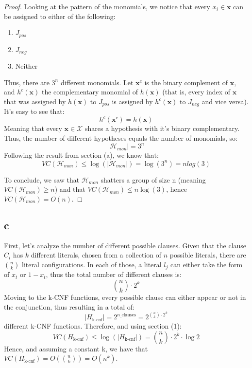 \begin{proof}
    Looking at the pattern of the monomials, we notice that every $x_i \in \boldsymbol{x}$ can be assigned to either of the following:
    \begin{enumerate}
        \item $J_{pos}$
        \item $J_{neg}$
        \item Neither
    \end{enumerate}
    Thus, there are $3^n$ different monomials. 
    Let $\boldsymbol{x}^c$ is the binary complement of $\boldsymbol{x}$, and $h^c(\boldsymbol{x})$ the complementary monomial of $h(\boldsymbol{x})$ (that is, every index of $\boldsymbol{x}$ that was assigned by $h(\boldsymbol{x})$ to $J_{pos}$ is assigned by $h^c(\boldsymbol{x})$ to $J_{neg}$ and vice versa).
    It's easy to see that:
    \begin{equation*}
        h^c(\boldsymbol{x}^c) = h(\boldsymbol{x})
    \end{equation*}
    Meaning that every $\boldsymbol{x} \in \mathcal{X}$ shares a hypothesis with it's binary complementary. Thus, the number of different hypotheses equals the number of monomials, so:
    \begin{equation*}
        |\mathcal{H}_{mon}| = 3^n
    \end{equation*}
    Following the result from section (a), we know that:
    \begin{equation*}
        VC(\mathcal{H}_{mon}) \leq \log(|\mathcal{H}_{mon}|) = \log(3^n) = n log(3)
    \end{equation*}
    
    To conclude, we saw that $\mathcal{H}_{mon}$ shatters a group of size n (meaning $VC(\mathcal{H}_{mon}) \geq n$) and that $VC(\mathcal{H}_{mon}) \leq n\log(3)$, hence $VC(\mathcal{H}_{mon}) = O(n)$.
\end{proof}

\subsection*{c}
First, let's analyze the number of different possible clauses. Given that the clause $C_i$ has $k$ different literals, chosen from a collection of $n$ possible literals, there are $n \choose k$ literal configurations. In each of those, a literal $l_j$ can either take the form of $x_t$ or $1-x_t$, thus the total number of different clauses is:
\begin{equation*}
    {n \choose k} \cdot 2^k
\end{equation*}
Moving to the k-CNF functions, every possible clause can either appear or not in the conjunction, thus resulting in a total of:
\begin{equation*}
    |H_{\text{k-cnf}}| = 2^{n\_{\text{clauses}}} = 2^{{n \choose k} \cdot 2^k}
\end{equation*}
different k-CNF functions. Therefore, and using section (1):
\begin{equation*}
    VC(H_{\text{k-cnf}}) \leq \log(|H_{\text{k-cnf}}|) = {n \choose k} \cdot 2^k \cdot \log 2
\end{equation*}
Hence, and assuming a constant k, we have that $VC(H_{\text{k-cnf}}) = O({n \choose k}) = O(n^k)$.
